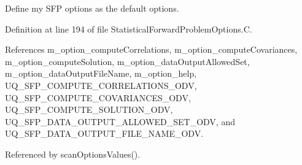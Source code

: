 Define my S\-F\-P options as the default options. 



Definition at line 194 of file Statistical\-Forward\-Problem\-Options.\-C.



References m\-\_\-option\-\_\-compute\-Correlations, m\-\_\-option\-\_\-compute\-Covariances, m\-\_\-option\-\_\-compute\-Solution, m\-\_\-option\-\_\-data\-Output\-Allowed\-Set, m\-\_\-option\-\_\-data\-Output\-File\-Name, m\-\_\-option\-\_\-help, U\-Q\-\_\-\-S\-F\-P\-\_\-\-C\-O\-M\-P\-U\-T\-E\-\_\-\-C\-O\-R\-R\-E\-L\-A\-T\-I\-O\-N\-S\-\_\-\-O\-D\-V, U\-Q\-\_\-\-S\-F\-P\-\_\-\-C\-O\-M\-P\-U\-T\-E\-\_\-\-C\-O\-V\-A\-R\-I\-A\-N\-C\-E\-S\-\_\-\-O\-D\-V, U\-Q\-\_\-\-S\-F\-P\-\_\-\-C\-O\-M\-P\-U\-T\-E\-\_\-\-S\-O\-L\-U\-T\-I\-O\-N\-\_\-\-O\-D\-V, U\-Q\-\_\-\-S\-F\-P\-\_\-\-D\-A\-T\-A\-\_\-\-O\-U\-T\-P\-U\-T\-\_\-\-A\-L\-L\-O\-W\-E\-D\-\_\-\-S\-E\-T\-\_\-\-O\-D\-V, and U\-Q\-\_\-\-S\-F\-P\-\_\-\-D\-A\-T\-A\-\_\-\-O\-U\-T\-P\-U\-T\-\_\-\-F\-I\-L\-E\-\_\-\-N\-A\-M\-E\-\_\-\-O\-D\-V.



Referenced by scan\-Options\-Values().


